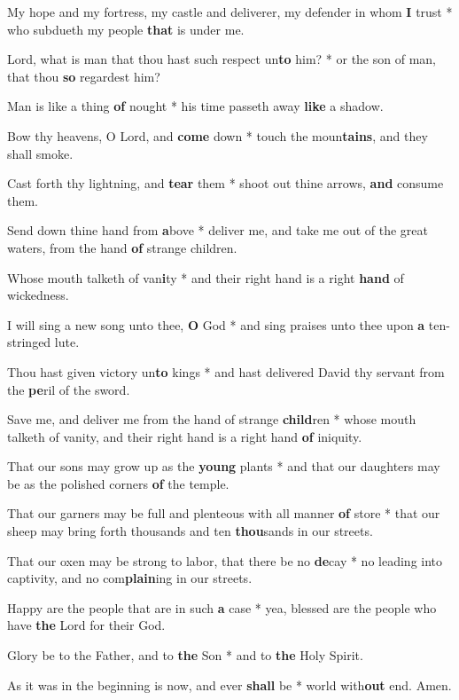\begin{multicols}{2}
	My hope and my fortress, my castle and deliverer, my defender in whom \textbf{I} trust * who subdueth my people \textbf{that} is under me.
	
	Lord, what is man that thou hast such respect un\textbf{to} him? * or the son of man, that thou \textbf{so} regardest him?
	
	Man is like a thing \textbf{of} nought * his time passeth away \textbf{like} a shadow.
	
	Bow thy heavens, O Lord, and \textbf{come} down * touch the moun\textbf{tains}, and they shall smoke.
	
	Cast forth thy lightning, and \textbf{tear} them * shoot out thine arrows, \textbf{and} consume them.
	
	Send down thine hand from \textbf{a}bove * deliver me, and take me out of the great waters, from the hand \textbf{of} strange children.
	
	Whose mouth talketh of van\textbf{i}ty * and their right hand is a right \textbf{hand} of wickedness.
	
	I will sing a new song unto thee, \textbf{O} God * and sing praises unto thee upon \textbf{a} ten-stringed lute.
	
	Thou hast given victory un\textbf{to} kings * and hast delivered David thy servant from the \textbf{pe}ril of the sword.
	
	Save me, and deliver me from the hand of strange \textbf{child}ren * whose mouth talketh of vanity, and their right hand is a right hand \textbf{of} iniquity.
	
	That our sons may grow up as the \textbf{young} plants * and that our daughters may be as the polished corners \textbf{of} the temple.
	
	That our garners may be full and plenteous with all manner \textbf{of} store * that our sheep may bring forth thousands and ten \textbf{thou}sands in our streets.
	
	That our oxen may be strong to labor, that there be no \textbf{de}cay * no leading into captivity, and no com\textbf{plain}ing in our streets.
	
	Happy are the people that are in such \textbf{a} case * yea, blessed are the people who have \textbf{the} Lord for their God.
	
	Glory be to the Father, and to \textbf{the} Son * and to \textbf{the} Holy Spirit.
	
	As it was in the beginning is now, and ever \textbf{shall} be * world with\textbf{out} end. Amen.
\end{multicols}